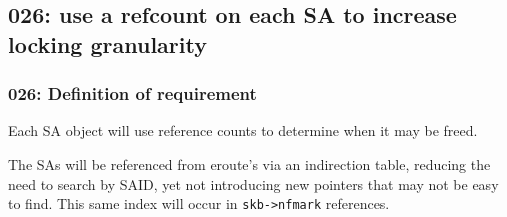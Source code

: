 \subsection{026: use a refcount on each SA to increase locking granularity}

\subsubsection{026: Definition of requirement }

Each SA object will use reference counts to determine when it may be freed.

The SAs will be referenced from eroute's via an indirection table, reducing
the need to search by SAID, yet not introducing new pointers that may not be
easy to find. This same index will occur in {\tt skb->nfmark} references.



